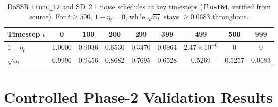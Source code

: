 \documentclass[11pt]{article}
\begin{document}
\begin{table}[ht]
\centering
\small
\caption{Live \texttt{ControlLDM} FP32 gradient check: Two-Pass chain-rule backward vs.\ simultaneous joint graph ($\alpha_{\text{text}} = 5.0$, $\lambda=0.1$, $32\times 32$ latent on \texttt{lora3-lambda01-pilot}; training runs used FP16 autocast).}
\label{tab:fp32_grad}
\end{table}

\begin{table}[ht]
\centering
\footnotesize
\caption{DoSSR \texttt{trunc\_12} and SD~2.1 noise schedules at key timesteps (\texttt{float64}, verified from source). For $t \ge 500$, $1-\eta_t = 0$, while $\sqrt{\bar{\alpha}_t}$ stays $\ge 0.0683$ throughout.}
\label{tab:schedule}
\begin{tabular}{lcccccccc}
\toprule
Timestep $t$ & 0 & 100 & 200 & 299 & 399 & 499 & 500 & 999 \\
\midrule
$1-\eta_t$ & 1.0000 & 0.9036 & 0.6530 & 0.3470 & 0.0964 & $2.47\times 10^{-6}$ & 0 & 0 \\
$\sqrt{\bar{\alpha}_t}$ & 0.9996 & 0.9456 & 0.8682 & 0.7695 & 0.6528 & 0.5269 & 0.5257 & 0.0683 \\
\bottomrule
\end{tabular}
\end{table}

\section{Controlled Phase-2 Validation Results}
\end{document}
